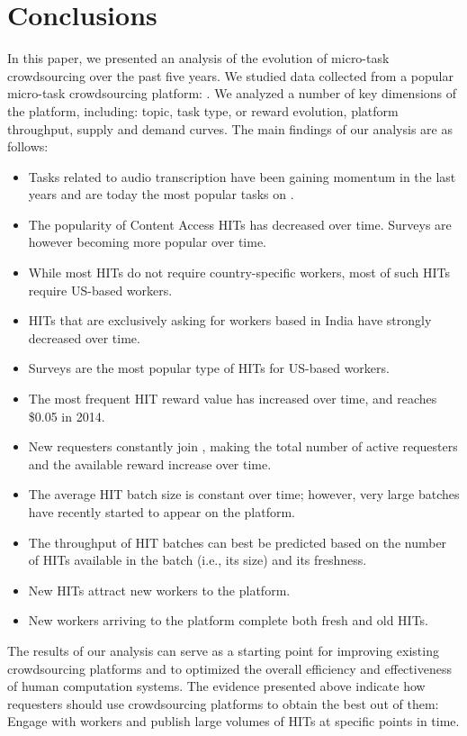 \section{Conclusions}\label{sec:conc}

In this paper, we presented an analysis of the evolution of micro-task crowdsourcing over the past five years.
We studied data collected from a popular micro-task crowdsourcing platform: \amt{}.
We analyzed a number of key dimensions of the platform, including: topic, task type, or reward evolution, platform throughput, supply and demand curves.
The main findings of our analysis are as follows:
\begin{itemize}[noitemsep,topsep=0pt,parsep=0pt,partopsep=0pt]
	\item Tasks related to audio transcription have been gaining momentum in the last years and are today the most popular tasks on \amt{}.
	\item The popularity of Content Access HITs has decreased over time. Surveys are however becoming more popular over time.
	\item While most HITs do not require country-specific workers, most of such HITs require US-based workers.
	\item HITs that are exclusively asking for workers based in India have strongly decreased over time.
	\item Surveys are the most popular type of HITs for US-based workers.
	\item The most frequent HIT reward value has increased over time, and reaches \$0.05 in 2014.
	\item New requesters constantly join \amt{}, making the total number of active requesters and the available reward increase over time.
	\item The average HIT batch size is constant over time; however, very large batches have recently started to appear on the platform.
	\item The throughput of HIT batches can best be predicted based on the number of HITs available in the batch (i.e., its size) and its freshness.
	\item New HITs attract new workers to the platform.
	\item New workers arriving to the platform complete both fresh and old HITs.
\end{itemize}

The results of our analysis can serve as a starting point for improving existing crowdsourcing platforms and to optimized the overall efficiency and effectiveness of human computation systems. The evidence presented above  indicate how requesters should use crowdsourcing platforms to obtain the best out of them: Engage with workers and publish large volumes of HITs at specific points in time. 

